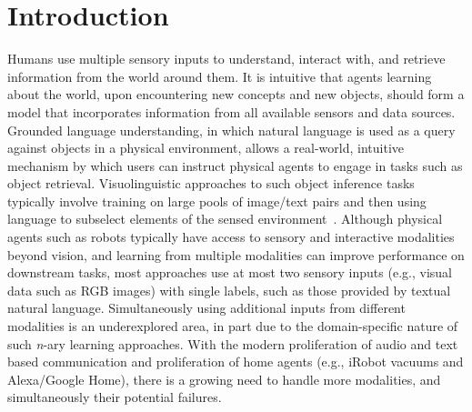 \documentclass[sigconf,natbib=true,anonymous=true]{acmart}
\begin{document}
\maketitle


    

\section{Introduction}
\label{intro}

Humans use multiple sensory inputs to understand, interact with, and retrieve information from the world around them. It is intuitive that agents learning about the world, upon encountering new concepts and new objects, should form a model that incorporates information from all available sensors and data sources. 
% 
Grounded language understanding, in which natural language is used as a query against objects in a physical environment, allows a real-world, intuitive mechanism by which users can instruct physical agents to engage in tasks such as object retrieval. Visuolinguistic approaches to such object inference tasks typically involve training on large pools of image/text pairs and then using language to subselect elements of the sensed environment~\cite{hong2021gilbert}. Although physical agents such as robots typically have access to sensory and interactive modalities beyond vision, and learning from multiple modalities can improve performance on downstream tasks, most approaches use at most two sensory inputs (e.g., visual data such as RGB images) with single labels, such as those provided by textual natural language. Simultaneously using additional inputs from different modalities is an underexplored area, in part due to the domain-specific nature of such \textit{n}-ary learning approaches. With the modern proliferation of audio and text based communication and proliferation of home agents (e.g., iRobot vacuums and Alexa/Google Home), there is a growing need to handle more modalities, and simultaneously their potential failures. 
\end{document}
